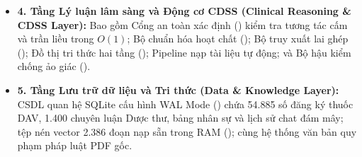 \begin{itemize}[leftmargin=1.5em]
    \item \textbf{4. Tầng Lý luận lâm sàng và Động cơ CDSS (Clinical Reasoning \& CDSS Layer):}
    Bao gồm Cổng an toàn xác định () kiểm tra tương tác cấm và trần liều trong $O(1)$; Bộ chuẩn hóa hoạt chất (); Bộ truy xuất lai ghép (); Đồ thị tri thức hai tầng (); Pipeline nạp tài liệu tự động; và Bộ hậu kiểm chống ảo giác ().

    \item \textbf{5. Tầng Lưu trữ dữ liệu và Tri thức (Data \& Knowledge Layer):}
    CSDL quan hệ SQLite cấu hình WAL Mode () chứa 54.885 số đăng ký thuốc DAV, 1.400 chuyên luận Dược thư, bảng nhân sự và lịch sử chat đám mây; tệp nén vector 2.386 đoạn nạp sẵn trong RAM (); cùng hệ thống văn bản quy phạm pháp luật PDF gốc.
\end{itemize}
